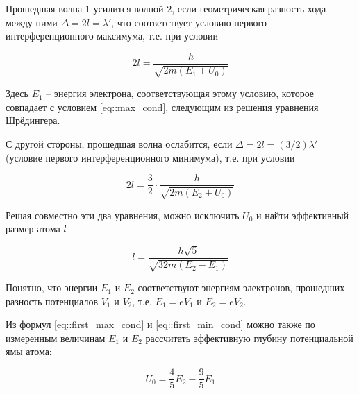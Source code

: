 Прошедшая волна $1$ усилится волной $2$, если геометрическая разность хода между
ними $\Delta = 2l = \lambda'$, что соответствует условию первого
интерференционного максимума, т.е. при условии

\begin{equation} \label{eq::first_max_cond}
  2l = \frac{h}{\sqrt{2m(E_1 + U_0)}}
\end{equation}

Здесь $E_1$ -- энергия электрона, соответствующая этому условию, которое
совпадает с условием \eqref{eq::max_cond}, следующим из решения уравнения
Шрёдингера.

С другой стороны, прошедшая волна ослабится, если $\Delta = 2l = (3/2)\lambda'$
(условие первого интерференционного минимума), т.е. при условии

\begin{equation} \label{eq::first_min_cond}
  2l = \frac{3}{2} \cdot \frac{h}{\sqrt{2m(E_2 + U_0)}}
\end{equation}

Решая совместно эти два уравнения, можно исключить $U_0$ и найти эффективный
размер атома $l$

\begin{equation}\label{eq::l_3}
  l = \frac{h \sqrt{5}}{\sqrt{32m(E_2 - E_1)}}
\end{equation}

Понятно, что энергии $E_1$ и $E_2$ соответствуют энергиям электронов, прошедших
разность потенциалов $V_1$ и $V_2$, т.е. $E_1 = e V_1$ и $E_2 = e V_2$.

Из формул \eqref{eq::first_max_cond} и \eqref{eq::first_min_cond} можно также по
измеренным величинам $E_1$ и $E_2$ рассчитать эффективную глубину потенциальной
ямы атома:

\begin{equation}\label{eq::Umin}
  U_0 = \frac{4}{5} E_2 - \frac{9}{5} E_1
\end{equation}
